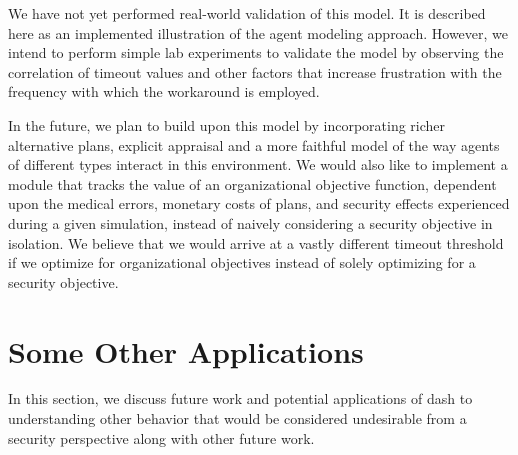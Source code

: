 \documentclass{acm_proc_article-sp}
\newcommand{\ignore}[1] {}
\begin{document}
{We have not yet performed real-world validation of this model. It is
described here as an implemented illustration of the agent modeling
approach. However, we intend to perform simple lab experiments to
validate the model by observing the correlation of timeout values and
other factors that increase frustration with the frequency with which
the workaround is employed.

In the future, we plan to build upon this model by incorporating
richer alternative plans, explicit appraisal and a more faithful model
of the way agents of different types interact in this environment.  We
would also like to implement a module that tracks the value of an
organizational objective function, dependent upon the medical errors,
monetary costs of plans, and security effects experienced during a
given simulation, instead of naively considering a security objective
in isolation.  We believe that we would arrive at a vastly different
timeout threshold if we optimize for organizational objectives instead
of solely optimizing for a security objective.}

\ignore{\textcolor{red}{
I swapped the paragraph given below with the previous  paragraph:
In the future, we plan to build upon this model by incorporating
richer alternative plans, explicit appraisal and a more faithful model
of the way agents of different types interact in this environment. It
would also be valuable to gather additional security and 
organizational statistics. Furthermore, we believe the model can be
used to explore an approach setting a timeout threshold that minimizes
some global objective function depending on variables such as
knowledge and ease of applying the workaround, monetary costs of
longer plans and of medical errors, frustration and other emotions,
user biases, etc. We believe such an approach would admit a vastly
different optimal solution than would be obtained by ignoring these
user aspects.
}}


\section{Some Other Applications}
\label{sec-future}

In this section, we discuss future work and potential applications of
{\sc dash} to understanding other behavior that would be considered
undesirable from a security perspective along with other future
work. 
\end{document}
